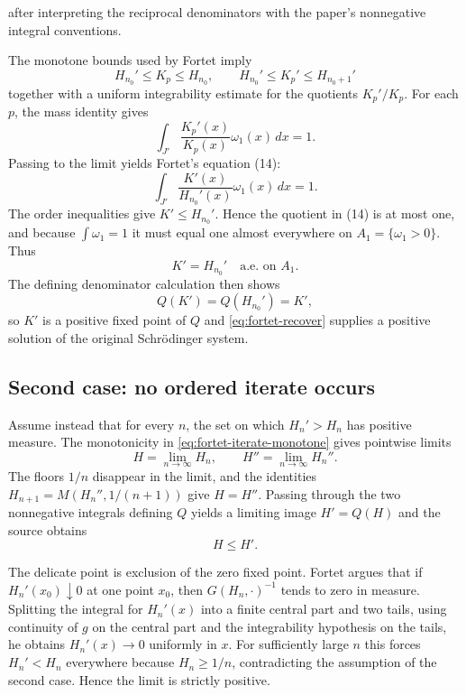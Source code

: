 after interpreting the reciprocal denominators with the paper's nonnegative
integral conventions.

The monotone bounds used by Fortet imply
\[
  H_{n_0}'\le K_p\le H_{n_0},
  \qquad
  H_{n_0}'\le K_p'\le H_{n_0+1}'
\]
together with a uniform integrability estimate for the quotients $K_p'/K_p$.
For each $p$, the mass identity gives
\[
  \int_{J'}\frac{K_p'(x)}{K_p(x)}\omega_1(x)\,dx=1.
\]
Passing to the limit yields Fortet's equation (14):
\begin{equation}
  \int_{J'}\frac{K'(x)}{H_{n_0}'(x)}\omega_1(x)\,dx=1. \tag{14}
\end{equation}
The order inequalities give $K'\le H_{n_0}'$.  Hence the quotient in
(14) is at most one, and because $\int\omega_1=1$ it must equal one
almost everywhere on $A_1=\{\omega_1>0\}$.  Thus
\[
  K'=H_{n_0}' \quad\text{a.e. on }A_1.
\]
The defining denominator calculation then shows
\[
  Q(K')=Q(H_{n_0}')=K',
\]
so $K'$ is a positive fixed point of $Q$ and
\eqref{eq:fortet-recover} supplies a positive solution of the original
Schr\"odinger system.

\subsection{Second case: no ordered iterate occurs}
Assume instead that for every $n$, the set on which $H_n'>H_n$ has positive
measure.  The monotonicity in \eqref{eq:fortet-iterate-monotone} gives
pointwise limits
\[
  H=\lim_{n\to\infty}H_n,
  \qquad
  H''=\lim_{n\to\infty}H_n''.
\]
The floors $1/n$ disappear in the limit, and the identities
$H_{n+1}=M(H_n'',1/(n+1))$ give $H=H''$.  Passing through the two
nonnegative integrals defining $Q$ yields a limiting image $H'=Q(H)$ and
the source obtains
\begin{equation}
  H\le H'. \tag{15}\label{eq:fortet-limit-order}
\end{equation}

The delicate point is exclusion of the zero fixed point.  Fortet argues that
if $H_n'(x_0)\downarrow0$ at one point $x_0$, then
$G(H_n,\cdot)^{-1}$ tends to zero in measure.  Splitting the integral for
$H_n'(x)$ into a finite central part and two tails, using continuity of $g$
on the central part and the integrability hypothesis on the tails, he obtains
$H_n'(x)\to0$ uniformly in $x$.  For sufficiently large $n$ this forces
$H_n'<H_n$ everywhere because $H_n\ge1/n$, contradicting the assumption of
the second case.  Hence the limit is strictly positive.

